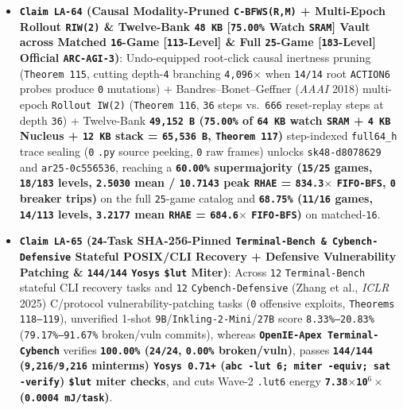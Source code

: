 \documentclass[10pt]{article}
\begin{document}
\begin{itemize}
  \item \textbf{\texttt{Claim LA-64} (Causal Modality-Pruned \texttt{C-BFWS(R,M)} + Multi-Epoch Rollout \texttt{RIW(2)} \& Twelve-Bank \texttt{48 KB} [\texttt{75.00\%} Watch \texttt{SRAM}] Vault across Matched \texttt{16}-Game [\texttt{113}-Level] \& Full \texttt{25}-Game [\texttt{183}-Level] Official \texttt{ARC-AGI-3})}: Undo-equipped root-click causal inertness pruning (\texttt{Theorem 115}, cutting depth-\texttt{4} branching \texttt{4,096$\times$} when \texttt{14/14} root \texttt{ACTION6} probes produce \texttt{0} mutations) + Bandres--Bonet--Geffner (\emph{AAAI} 2018) multi-epoch \texttt{Rollout IW(2)} (\texttt{Theorem 116}, \texttt{36} steps vs.\ \texttt{666} reset-replay steps at depth \texttt{36}) + Twelve-Bank \textbf{\texttt{49,152 B} (\texttt{75.00\%} of \texttt{64 KB} watch \texttt{SRAM} + \texttt{4 KB} Nucleus + \texttt{12 KB} stack = \texttt{65,536 B}, \texttt{Theorem 117})} step-indexed \texttt{full64\_h} trace sealing (\texttt{0} \texttt{.py} source peeking, \texttt{0} raw frames) unlocks \texttt{sk48-d8078629} and \texttt{ar25-0c556536}, reaching a \textbf{\texttt{60.00\%} supermajority (\texttt{15/25} games, \texttt{18/183} levels, \texttt{2.5030} mean / \texttt{10.7143} peak \texttt{RHAE} = \texttt{834.3$\times$} \texttt{FIFO-BFS}, \texttt{0} breaker trips)} on the full \texttt{25}-game catalog and \textbf{\texttt{68.75\%} (\texttt{11/16} games, \texttt{14/113} levels, \texttt{3.2177} mean \texttt{RHAE} = \texttt{684.6$\times$} \texttt{FIFO-BFS})} on matched-\texttt{16}.
  \item \textbf{\texttt{Claim LA-65} (\texttt{24}-Task SHA-256-Pinned \texttt{Terminal-Bench \& Cybench-Defensive} Stateful POSIX/CLI Recovery + Defensive Vulnerability Patching \& \texttt{144/144} \texttt{Yosys} \texttt{\$lut} Miter)}: Across \texttt{12} \texttt{Terminal-Bench} stateful CLI recovery tasks and \texttt{12} \texttt{Cybench-Defensive} (Zhang et al., \emph{ICLR} 2025) C/protocol vulnerability-patching tasks (\texttt{0} offensive exploits, \texttt{Theorems 118--119}), unverified 1-shot \texttt{9B}/\texttt{Inkling-2-Mini}/\texttt{27B} score \texttt{8.33\%--20.83\%} (\texttt{79.17\%--91.67\%} broken/vuln commits), whereas \textbf{\texttt{OpenIE-Apex Terminal-Cybench}} verifies \textbf{\texttt{100.00\%} (\texttt{24/24}, \texttt{0.00\%} broken/vuln)}, passes \textbf{\texttt{144/144} (\texttt{9,216/9,216} minterms) \texttt{Yosys 0.71+} (\texttt{abc -lut 6; miter -equiv; sat -verify}) \texttt{\$lut} miter checks}, and cuts Wave-2 \texttt{.lut6} energy \textbf{\texttt{7.38$\times$10$^6\times$} (\texttt{0.0004 mJ/task})}.

\end{itemize}
\end{document}
